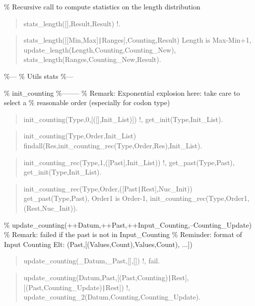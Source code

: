 \% Recursive call to compute statistics on the length distribution

\begin{quote}
stats_length([],Result,Result) \Sneck{}
!.
\end{quote}

\begin{quote}
stats_length([[Min,Max]{\tt\string|}Ranges],Counting,Result) \Sneck{}
Length is Max-Min+1,
update_length(Length,Counting,Counting_New),
stats_length(Ranges,Counting_New,Result).
\end{quote}

\%---
\% Utils stats
\%---

\% init_counting
\%--------
\% Remark: Exponential explosion here: take care to select a
\% reasonable order (especially for codon type)

\begin{quote}
init_counting(Type,0,[([],Init_List)]) \Sneck{}
!,
get_init(Type,Init_List).
\end{quote}

\begin{quote}
init_counting(Type,Order,Init_List) \Sneck{}
findall(Res,init_counting_rec(Type,Order,Res),Init_List).
\end{quote}

\begin{quote}
init_counting_rec(Type,1,([Past],Init_List)) \Sneck{}
!,
get_past(Type,Past),
get_init(Type,Init_List).
\end{quote}

\begin{quote}
init_counting_rec(Type,Order,([Past{\tt\string|}Rest],Nuc_Init)) \Sneck{}
get_past(Type,Past),
Order1 is Order-1,
init_counting_rec(Type,Order1,(Rest,Nuc_Init)).
\end{quote}

\% update_counting(++Datum,++Past,++Input_Counting,--Counting_Update)
\% Remark: failed if the past is not in Input_Counting
\% Reminder: format of Input Counting Elt: (Past,[(Values,Count),Values,Count), ...])

\begin{quote}
update_counting(_Datum,_Past,[],[]) \Sneck{}
!,
fail.
\end{quote}

\begin{quote}
update_counting(Datum,Past,[(Past,Counting){\tt\string|}Rest],[(Past,Counting_Update){\tt\string|}Rest]) \Sneck{}
!,
update_counting_2(Datum,Counting,Counting_Update).
\end{quote}

